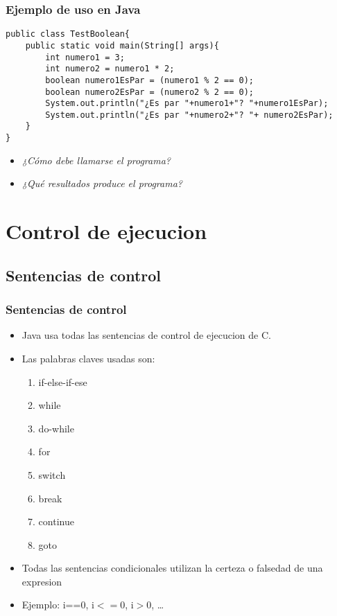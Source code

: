 \documentclass{beamer}
\begin{document}
\begin{frame}[fragile]
    \frametitle{Ejemplo de uso en Java}
\pause
\begin{scriptsize}
\begin{verbatim}
public class TestBoolean{
    public static void main(String[] args){
        int numero1 = 3;
        int numero2 = numero1 * 2;
        boolean numero1EsPar = (numero1 % 2 == 0);
        boolean numero2EsPar = (numero2 % 2 == 0);
        System.out.println("¿Es par "+numero1+"? "+numero1EsPar);
        System.out.println("¿Es par "+numero2+"? "+ numero2EsPar);
    }
}
\end{verbatim} 
\end{scriptsize}  
\pause
\begin{itemize}[<+->]
\item \emph{¿Cómo debe llamarse el programa?}
\item \emph{¿Qué resultados produce el programa?}
\end{itemize}
\pause
\end{frame}

\section{Control de ejecucion}

\subsection{Sentencias de control}
\begin{frame}[fragile]
    \frametitle{Sentencias de control}
 
\begin{itemize}[<+-| alert@+>]
\item Java usa todas las sentencias de control de ejecucion de C.
\item Las palabras claves usadas son:
\begin{enumerate}
\item if-else-if-ese
\item while
\item do-while
\item for
\item switch
\item break
\item continue
\item goto
\end{enumerate}
\item Todas las sentencias condicionales utilizan la certeza o falsedad de una expresion
\item Ejemplo: i==0, i$<=$0, i$>$0, \dots
\end{itemize}
\pause
\end{frame}
\end{document}
